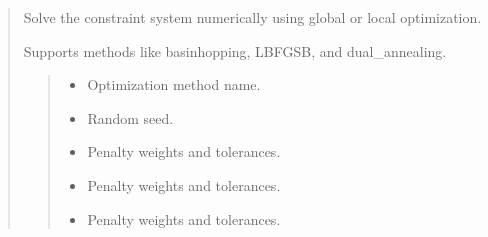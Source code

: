 \documentclass[letterpaper,10pt,english]{sphinxmanual}
\begin{document}
\begin{quote}
\begin{fulllineitems}
\begin{fulllineitems}
\label{\detokenize{pygeox:pygeox.solver.SolverNamespace.numerical}}
\pysigstartsignatures
\pysiglinewithargsret
{}
{\sphinxparamcomma {}\sphinxparamcomma {}\sphinxparamcomma {}\sphinxparamcomma {}\sphinxparamcomma {}\sphinxparamcomma {}\sphinxparamcomma {}\sphinxparamcomma {}\sphinxparamcomma {}\sphinxparamcomma {}}
{}
\pysigstopsignatures
\sphinxAtStartPar
Solve the constraint system numerically using global or local optimization.

\sphinxAtStartPar
Supports methods like basinhopping, L\sphinxhyphen{}BFGS\sphinxhyphen{}B, and dual\_annealing.
\begin{quote}\begin{description}
\begin{itemize}
\item {} 
\sphinxAtStartPar
{} \textendash{} Optimization method name.

\item {} 
\sphinxAtStartPar
{} \textendash{} Random seed.

\item {} 
\sphinxAtStartPar
{} \textendash{} Penalty weights and tolerances.

\item {} 
\sphinxAtStartPar
{} \textendash{} Penalty weights and tolerances.

\item {} 
\sphinxAtStartPar
{} \textendash{} Penalty weights and tolerances.


\end{itemize}
\end{description}
\end{quote}
\end{fulllineitems}
\end{fulllineitems}
\end{quote}
\end{document}
